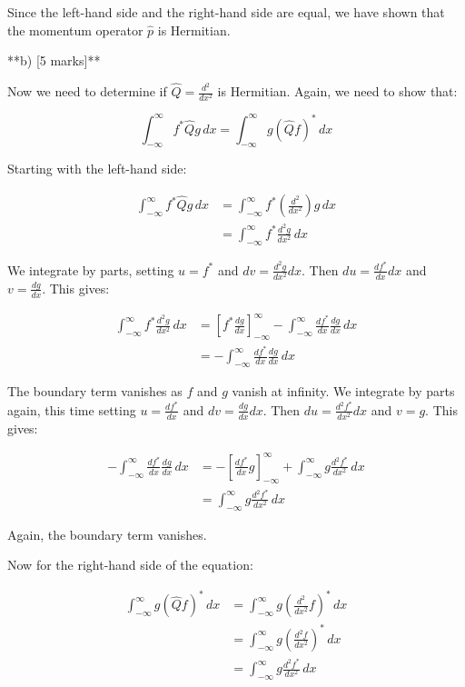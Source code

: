 \documentclass{article}
\begin{document}
Since the left-hand side and the right-hand side are equal, we have shown that the momentum operator $\hat{p}$ is Hermitian.

**b) [5 marks]**

Now we need to determine if $\hat{Q} = \frac{d^2}{dx^2}$ is Hermitian.  Again, we need to show that:

\begin{equation*}
\int_{-\infty}^{\infty} f^* \hat{Q} g \, dx = \int_{-\infty}^{\infty} g (\hat{Q} f)^* \, dx
\end{equation*}

Starting with the left-hand side:

\begin{align*}
\int_{-\infty}^{\infty} f^* \hat{Q} g \, dx &= \int_{-\infty}^{\infty} f^* \left( \frac{d^2}{dx^2} \right) g \, dx \\
&= \int_{-\infty}^{\infty} f^* \frac{d^2g}{dx^2} \, dx
\end{align*}

We integrate by parts, setting $u = f^*$ and $dv = \frac{d^2g}{dx^2} dx$.  Then $du = \frac{df^*}{dx} dx$ and $v = \frac{dg}{dx}$. This gives:

\begin{align*}
\int_{-\infty}^{\infty} f^* \frac{d^2g}{dx^2} \, dx &= \left[ f^* \frac{dg}{dx} \right]_{-\infty}^{\infty} - \int_{-\infty}^{\infty} \frac{df^*}{dx} \frac{dg}{dx} \, dx \\
&= - \int_{-\infty}^{\infty} \frac{df^*}{dx} \frac{dg}{dx} \, dx
\end{align*}

The boundary term vanishes as $f$ and $g$ vanish at infinity. We integrate by parts again, this time setting $u = \frac{df^*}{dx}$ and $dv = \frac{dg}{dx} dx$.  Then $du = \frac{d^2f^*}{dx^2} dx$ and $v = g$.  This gives:

\begin{align*}
- \int_{-\infty}^{\infty} \frac{df^*}{dx} \frac{dg}{dx} \, dx &= -\left[ \frac{df^*}{dx} g \right]_{-\infty}^{\infty} + \int_{-\infty}^{\infty} g \frac{d^2f^*}{dx^2} \, dx \\
&= \int_{-\infty}^{\infty} g \frac{d^2f^*}{dx^2} \, dx
\end{align*}

Again, the boundary term vanishes.

Now for the right-hand side of the equation:

\begin{align*}
\int_{-\infty}^{\infty} g (\hat{Q} f)^* \, dx &= \int_{-\infty}^{\infty} g \left( \frac{d^2}{dx^2} f \right)^* \, dx \\
&= \int_{-\infty}^{\infty} g \left( \frac{d^2f}{dx^2} \right)^* \, dx \\
&= \int_{-\infty}^{\infty} g \frac{d^2f^*}{dx^2} \, dx
\end{align*}
\end{document}
